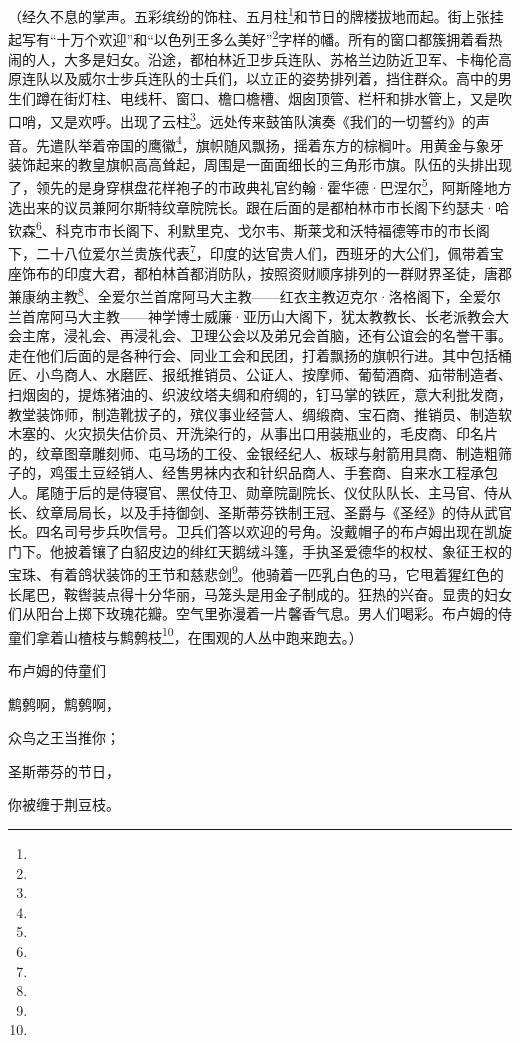 \par （经久不息的掌声。五彩缤纷的饰柱、五月柱\footnote{}和节日的牌楼拔地而起。街上张挂起写有“十万个欢迎”和“以色列王多么美好”\footnote{}字样的幡。所有的窗口都簇拥着看热闹的人，大多是妇女。沿途，都柏林近卫步兵连队、苏格兰边防近卫军、卡梅伦高原连队以及威尔士步兵连队的士兵们，以立正的姿势排列着，挡住群众。高中的男生们蹲在街灯柱、电线杆、窗口、檐口檐槽、烟囱顶管、栏杆和排水管上，又是吹口哨，又是欢呼。出现了云柱\footnote{}。远处传来鼓笛队演奏《我们的一切誓约》的声音。先遣队举着帝国的鹰徽\footnote{}，旗帜随风飘扬，摇着东方的棕榈叶。用黄金与象牙装饰起来的教皇旗帜高高耸起，周围是一面面细长的三角形市旗。队伍的头排出现了，领先的是身穿棋盘花样袍子的市政典礼官约翰·霍华德·巴涅尔\footnote{}，阿斯隆地方选出来的议员兼阿尔斯特纹章院院长。跟在后面的是都柏林市市长阁下约瑟夫·哈钦森\footnote{}、科克市市长阁下、利默里克、戈尔韦、斯莱戈和沃特福德等市的市长阁下，二十八位爱尔兰贵族代表\footnote{}，印度的达官贵人们，西班牙的大公们，佩带着宝座饰布的印度大君，都柏林首都消防队，按照资财顺序排列的一群财界圣徒，唐郡兼康纳主教\footnote{}、全爱尔兰首席阿马大主教——红衣主教迈克尔·洛格阁下，全爱尔兰首席阿马大主教——神学博士威廉·亚历山大阁下，犹太教教长、长老派教会大会主席，浸礼会、再浸礼会、卫理公会以及弟兄会首脑，还有公谊会的名誉干事。走在他们后面的是各种行会、同业工会和民团，打着飘扬的旗帜行进。其中包括桶匠、小鸟商人、水磨匠、报纸推销员、公证人、按摩师、葡萄酒商、疝带制造者、扫烟囱的，提炼猪油的、织波纹塔夫绸和府绸的，钉马掌的铁匠，意大利批发商，教堂装饰师，制造靴拔子的，殡仪事业经营人、绸缎商、宝石商、推销员、制造软木塞的、火灾损失估价员、开洗染行的，从事出口用装瓶业的，毛皮商、印名片的，纹章图章雕刻师、屯马场的工役、金银经纪人、板球与射箭用具商、制造粗筛子的，鸡蛋土豆经销人、经售男袜内衣和针织品商人、手套商、自来水工程承包人。尾随于后的是侍寝官、黑仗侍卫、勋章院副院长、仪仗队队长、主马官、侍从长、纹章局局长，以及手持御剑、圣斯蒂芬铁制王冠、圣爵与《圣经》的侍从武官长。四名司号步兵吹信号。卫兵们答以欢迎的号角。没戴帽子的布卢姆出现在凯旋门下。他披着镶了白貂皮边的绯红天鹅绒斗篷，手执圣爱德华的权杖、象征王权的宝珠、有着鸽状装饰的王节和慈悲剑\footnote{}。他骑着一匹乳白色的马，它甩着猩红色的长尾巴，鞍辔装点得十分华丽，马笼头是用金子制成的。狂热的兴奋。显贵的妇女们从阳台上掷下玫瑰花瓣。空气里弥漫着一片馨香气息。男人们喝彩。布卢姆的侍童们拿着山楂枝与鹪鹩枝\footnote{}，在围观的人丛中跑来跑去。）
\par 布卢姆的侍童们
\par 鹪鹩啊，鹪鹩啊，
\par 众鸟之王当推你；
\par 圣斯蒂芬的节日，
\par 你被缠于荆豆枝。

